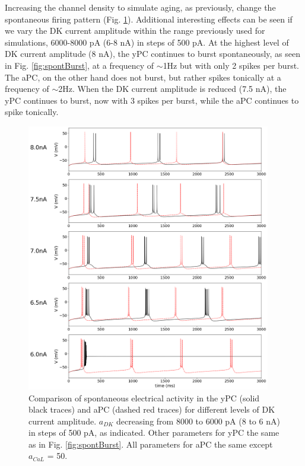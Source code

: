 \documentclass[12pt]{article}
\begin{document}
Increasing the {\Ca} channel density to simulate aging, as previously, change the spontaneous firing pattern (Fig. \ref{fig:burstingAging}). Additional interesting effects can be seen if we vary the DK current amplitude within the range previously used for simulations, 6000-8000 pA (6-8 nA) in steps of 500 pA. At the highest level of DK current amplitude (8 nA), the yPC continues to burst spontaneously, as seen in Fig. \ref{fig:spontBurst}, at a frequency of $\sim$1Hz but with only 2 spikes per burst. The aPC, on the other hand does not burst, but rather spikes tonically at a frequency of $\sim$2Hz. When the DK current amplitude is reduced (7.5 nA), the yPC continues to burst, now with 3 spikes per burst, while the aPC continues to spike tonically. 

\begin{figure}[h!]
\centering
\includegraphics[width=0.95\textwidth]{figures/fig6.png}
\caption{Comparison of spontaneous electrical activity in the yPC (solid black traces) and aPC (dashed red traces) for different levels of DK current amplitude. $a_{DK}$ decreasing from 8000 to 6000 pA (8 to 6 nA) in steps of 500 pA, as indicated. Other parameters for yPC the same as in Fig. \ref{fig:spontBurst}. All parameters for aPC the same except $a_{CaL}$ = 50.}
\label{fig:burstingAging}
\end{figure}
\end{document}
